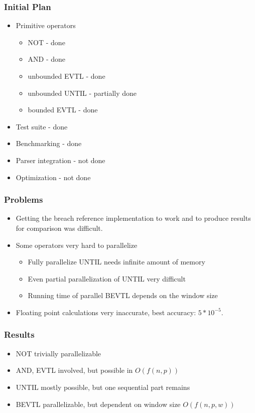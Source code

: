 \documentclass[notes=show]{beamer}
\begin{document}
\begin{frame}
\frametitle{Initial Plan}
\begin{itemize}
\item Primitive operators
\begin{itemize}
\item NOT - done
\item AND - done
\item unbounded EVTL - done
\item unbounded UNTIL - partially done
\item bounded EVTL - done
\end{itemize}
\item Test suite - done
\item Benchmarking - done
\item Parser integration - not done
\item Optimization - not done
\end{itemize}
\end{frame}

\begin{frame}
\frametitle{Problems}
\begin{itemize}
\item Getting the breach reference implementation to work and to produce results for
        comparison was difficult.
\item Some operators very hard to parallelize
\begin{itemize}
\item Fully parallelize UNTIL needs infinite amount of memory
\item Even partial parallelization of UNTIL very difficult
\item Running time of parallel BEVTL depends on the window size
\end{itemize}
\item Floating point calculations very inaccurate, best accuracy: $5*10^{-5}$.
\end{itemize}
\end{frame}

\begin{frame}
\frametitle{Results}
\begin{itemize}
\item NOT trivially parallelizable
\item AND, EVTL involved, but possible in $O(f(n,p))$
\item UNTIL mostly possible, but one sequential part remains
\item BEVTL parallelizable, but dependent on window size $O(f(n,p,w))$
\end{itemize}
\end{frame}
\end{document}
